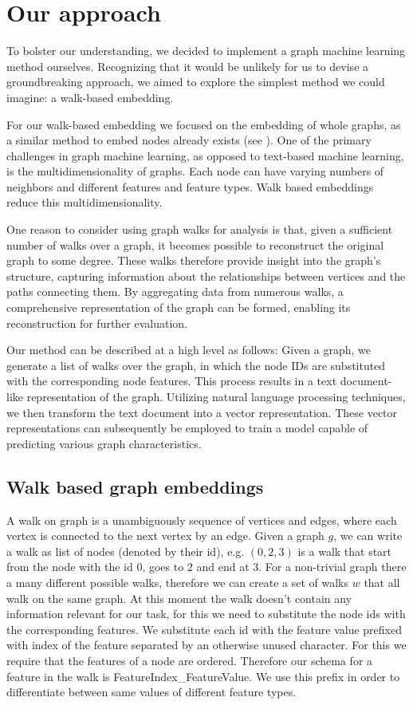 \section{Our approach}
To bolster our understanding, we decided to implement a graph machine learning method ourselves. Recognizing that it would be unlikely for us to devise a groundbreaking approach, we aimed to explore the simplest method we could imagine: a walk-based embedding.

For our walk-based embedding we focused on the embedding of whole graphs, as a similar method to embed nodes already exists (see \cite{2016node2vec}). One of the primary challenges in graph machine learning, as opposed to text-based machine learning, is the multidimensionality of graphs. Each node can have varying numbers of neighbors and different features and feature types. Walk based embeddings reduce this multidimensionality.

One reason to consider using graph walks for analysis is that, given a sufficient number of walks over a graph, it becomes possible to reconstruct the original graph to some degree\cite{Wittmann2009reconstruction}. These walks therefore provide insight into the graph's structure, capturing information about the relationships between vertices and the paths connecting them. By aggregating data from numerous walks, a comprehensive representation of the graph can be formed, enabling its reconstruction for further evaluation.

Our method can be described at a high level as follows: Given a graph, we generate a list of walks over the graph, in which the node IDs are substituted with the corresponding node features. This process results in a text document-like representation of the graph. Utilizing natural language processing techniques, we then transform the text document into a vector representation. These vector representations can subsequently be employed to train a model capable of predicting various graph characteristics.

\subsection{Walk based graph embeddings}
A walk on graph is a unambiguously sequence of vertices and edges, where each vertex is connected to the next vertex by an edge. Given a graph $g$, we can write a walk as list of nodes (denoted by their id), e.g. $(0, 2, 3)$ is a walk that start from the node with the id $0$, goes to $2$ and end at $3$. For a non-trivial graph there a many different possible walks, therefore we can create a set of walks $w$ that all walk on the same graph. At this moment the walk doesn't contain any information relevant for our task, for this we need to substitute the node ids with the corresponding features. We substitute each id with the feature value prefixed with index of the feature separated by an otherwise unused character. For this we require that the features of a node are ordered. Therefore our schema for a feature in the walk is FeatureIndex\_FeatureValue. We use this prefix in order to differentiate between same values of different feature types.

